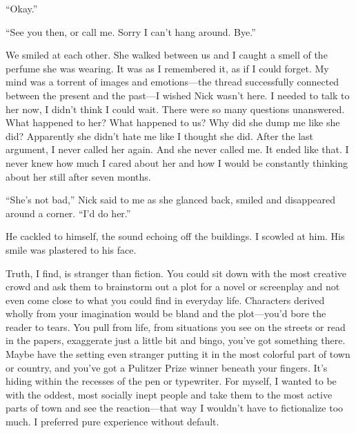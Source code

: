 ``Okay.''

``See you then, or call me. Sorry I can't hang around. Bye.''

We smiled at each other. She walked between us and I caught a smell of
the perfume she was wearing. It was as I remembered it, as if I could
forget. My mind was a torrent of images and emotions---the thread
successfully connected between the present and the past---I wished Nick
wasn't here. I needed to talk to her now, I didn't think I could wait.
There were so many questions unanswered. What happened to her? What
happened to us? Why did she dump me like she did? Apparently she didn't
hate me like I thought she did. After the last argument, I never called
her again. And she never called me. It ended like that. I never knew how
much I cared about her and how I would be constantly thinking about her
still after seven months.

``She's not bad,'' Nick said to me as she glanced back, smiled and
disappeared around a corner. ``I'd do her.''

He cackled to himself, the sound echoing off the buildings. I scowled at
him. His smile was plastered to his face.

Truth, I find, is stranger than fiction. You could sit down with the
most creative crowd and ask them to brainstorm out a plot for a novel or
screenplay and not even come close to what you could find in everyday
life. Characters derived wholly from your imagination would be bland and
the plot---you'd bore the reader to tears. You pull from life, from
situations you see on the streets or read in the papers, exaggerate just
a little bit and bingo, you've got something there. Maybe have the
setting even stranger putting it in the most colorful part of town or
country, and you've got a Pulitzer Prize winner beneath your fingers.
It's hiding within the recesses of the pen or typewriter. For myself, I
wanted to be with the oddest, most socially inept people and take them
to the most active parts of town and see the reaction---that way I
wouldn't have to fictionalize too much. I preferred pure experience
without default.

